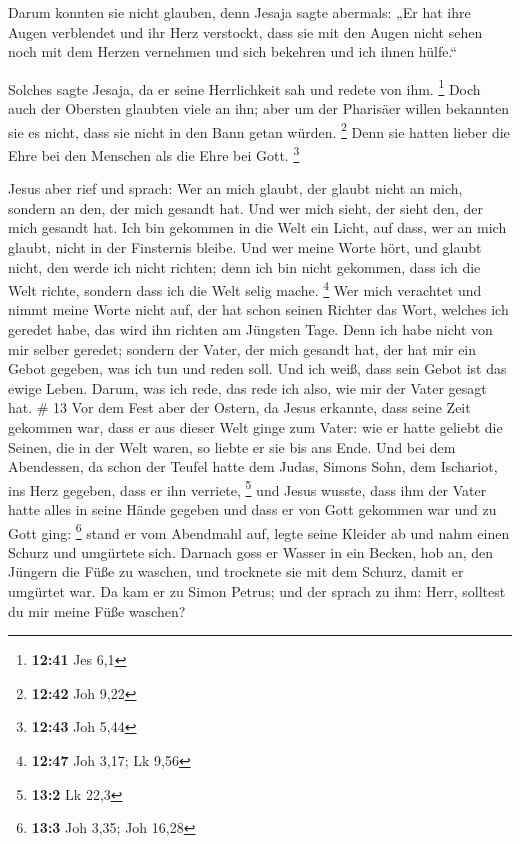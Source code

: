  Darum konnten sie nicht glauben, denn Jesaja sagte
abermals:  „Er hat ihre Augen verblendet und ihr Herz
verstockt, dass sie mit den Augen nicht sehen noch mit dem Herzen
vernehmen und sich bekehren und ich ihnen hülfe.``

 Solches sagte Jesaja, da er seine Herrlichkeit sah und
redete von ihm. \footnote{\textbf{12:41} Jes 6,1}  Doch
auch der Obersten glaubten viele an ihn; aber um der Pharisäer willen
bekannten sie es nicht, dass sie nicht in den Bann getan würden.
\footnote{\textbf{12:42} Joh 9,22}  Denn sie hatten
lieber die Ehre bei den Menschen als die Ehre bei Gott. \footnote{\textbf{12:43}
  Joh 5,44}

 Jesus aber rief und sprach: Wer an mich glaubt, der
glaubt nicht an mich, sondern an den, der mich gesandt hat.
 Und wer mich sieht, der sieht den, der mich gesandt hat.
 Ich bin gekommen in die Welt ein Licht, auf dass, wer an
mich glaubt, nicht in der Finsternis bleibe.  Und wer
meine Worte hört, und glaubt nicht, den werde ich nicht richten; denn
ich bin nicht gekommen, dass ich die Welt richte, sondern dass ich die
Welt selig mache. \footnote{\textbf{12:47} Joh 3,17; Lk 9,56}
 Wer mich verachtet und nimmt meine Worte nicht auf, der
hat schon seinen Richter das Wort, welches ich geredet habe, das wird
ihn richten am Jüngsten Tage.  Denn ich habe nicht von
mir selber geredet; sondern der Vater, der mich gesandt hat, der hat mir
ein Gebot gegeben, was ich tun und reden soll.  Und ich
weiß, dass sein Gebot ist das ewige Leben. Darum, was ich rede, das rede
ich also, wie mir der Vater gesagt hat. \# 13  Vor dem
Fest aber der Ostern, da Jesus erkannte, dass seine Zeit gekommen war,
dass er aus dieser Welt ginge zum Vater: wie er hatte geliebt die
Seinen, die in der Welt waren, so liebte er sie bis ans Ende.
 Und bei dem Abendessen, da schon der Teufel hatte dem
Judas, Simons Sohn, dem Ischariot, ins Herz gegeben, dass er ihn
verriete, \footnote{\textbf{13:2} Lk 22,3}  und Jesus
wusste, dass ihm der Vater hatte alles in seine Hände gegeben und dass
er von Gott gekommen war und zu Gott ging: \footnote{\textbf{13:3} Joh
  3,35; Joh 16,28}  stand er vom Abendmahl auf, legte
seine Kleider ab und nahm einen Schurz und umgürtete sich.
 Darnach goss er Wasser in ein Becken, hob an, den Jüngern
die Füße zu waschen, und trocknete sie mit dem Schurz, damit er umgürtet
war.  Da kam er zu Simon Petrus; und der sprach zu ihm:
Herr, solltest du mir meine Füße waschen?

